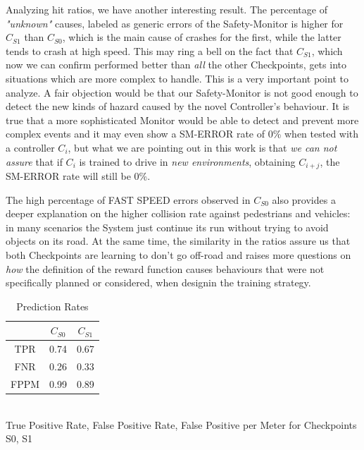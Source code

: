 Analyzing hit ratios, we have another interesting result. The percentage of \textsl{"unknown"} causes, labeled as generic errors of the Safety-Monitor is higher for $C_{S1}$ than $C_{S0}$, which is the main cause of crashes for the first, while the latter tends to crash at high speed. This may ring a bell on the fact that $C_{S1}$, which now we can confirm performed better than \textsl{all} the other Checkpoints, gets into situations which are more complex to handle. This is a very important point to analyze. A fair objection would be that our Safety-Monitor is not good enough to detect the new kinds of hazard caused by the novel Controller's behaviour. It is true that a more sophisticated Monitor would be able to detect and prevent more complex events and it may even show a SM-ERROR rate of 0\% when tested with a controller $C_{i}$, but what we are pointing out in this work is that \textsl{we can not assure} that if $C_{i}$ is trained to drive in \textsl{new environments}, obtaining $C_{i+j}$, the SM-ERROR rate will still be 0\%.\newline

The high percentage of FAST SPEED errors observed in $C_{S0}$ also provides a deeper explanation on the higher collision rate against pedestrians and vehicles: in many scenarios the System just continue its run without trying to avoid objects on its road. At the same time, the similarity in the ratios assure us that both Checkpoints are learning to don't go off-road and raises more questions on \textsl{how} the definition of the reward function causes behaviours that were not specifically planned or considered, when designin the training strategy.

\vspace{0.5cm}
\begin{table}[h]
	\caption{Prediction Rates}
	\begin{center}
		\begin{tabular}{ |c|c|c| }
			\hline
			& $C_{S0}$ & $C_{S1}$ \\
			\hline
			TPR & 0.74 & 0.67 \\
			\hline
			FNR & 0.26 & 0.33 \\
			\hline
			FPPM & 0.99 & 0.89 \\
			\hline
		\end{tabular}
		\\
		\vspace{0.3cm}
		True Positive Rate, False Positive Rate, False Positive per Meter for Checkpoints S0, S1
	\end{center}
\end{table}

